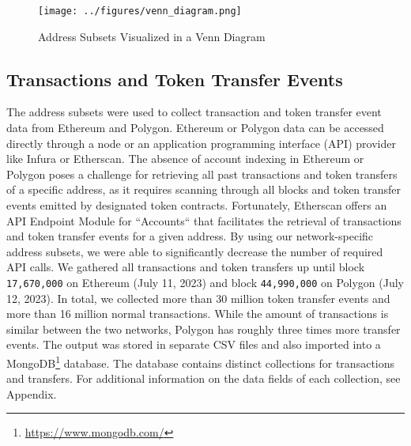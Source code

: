 \documentclass[12pt,a4paper,titlepage,oneside,english]{article}
\begin{document}
\begin{figure}[h!]
	\centering
	\texttt{[image: ../figures/venn\_diagram.png]}
	\caption{Address Subsets Visualized in a Venn Diagram}
	\label{fig:Venn}
\end{figure} 

\subsection{Transactions and Token Transfer Events}
The address subsets were used to collect transaction and token transfer event data from Ethereum and Polygon. Ethereum or Polygon data can be accessed directly through a node or an application programming interface (API) provider like Infura or Etherscan. The absence of account indexing in Ethereum or Polygon poses a challenge for retrieving all past transactions and token transfers of a specific address, as it requires scanning through all blocks and token transfer events emitted by designated token contracts. Fortunately, Etherscan offers an API Endpoint Module for ``Accounts`` that facilitates the retrieval of transactions and token transfer events for a given address. By using our network-specific address subsets, we were able to significantly decrease the number of required API calls. 
We gathered all transactions and token transfers up until block \texttt{17,670,000} on Ethereum (July 11, 2023) and block \texttt{44,990,000} on Polygon (July 12, 2023). In total, we collected more than 30 million %
token transfer events and more than 16 million %
 normal transactions. While the amount of transactions is similar between the two networks, Polygon has roughly three times more transfer events. \newline The output was stored in separate CSV files and also imported into a MongoDB\footnote{\url{https://www.mongodb.com/}} database. The database contains distinct collections for transactions and transfers. For additional information on the data fields of each collection, see Appendix. 
 

\iffalse
Transfer Events: 30,689,978
Transfer Events Ethereum: 7,832,778
Transfer Events Polygon: 22,857,200

Transactions = 16,092,531
Transactions Ethereum = 8,448,584
Transactions Polygon = 7,643,947

Figure X visualizes the number of daily transactions and token transfers for each chain.
\begin{figure}[h!]
	\centering
	\texttt{[image: ../figures/transfers\_tx\_by\_chain.png]}
	\caption{Monthly Transactions and Token Transfers by chain}
	\label{fig:Data}
\end{figure} 
Transfer Events, adding Information (isInSet) \\
Transactions \\
Filtering, Intra-set transfers\\
Data Structure, Fields \\
\fi
\end{document}
